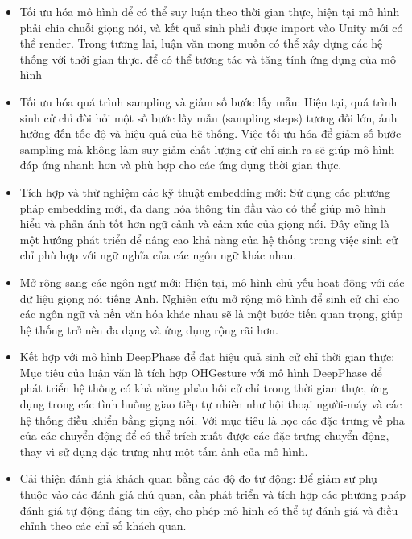 \begin{itemize}
	\item Tối ưu hóa mô hình để có thể suy luận theo thời gian thực, hiện tại mô hình phải chia chuỗi giọng nói, và kết quả sinh phải được  import vào Unity mới có thể render. Trong tương lai, luận văn mong muốn có thể xây dựng các hệ thống với thời gian thực. để có thể tương tác và tăng tính ứng dụng của mô hình
	
	\item Tối ưu hóa quá trình sampling và giảm số bước lấy mẫu: Hiện tại, quá trình sinh cử chỉ đòi hỏi một số bước lấy mẫu (sampling steps) tương đối lớn, ảnh hưởng đến tốc độ và hiệu quả của hệ thống. Việc tối ưu hóa để giảm số bước sampling mà không làm suy giảm chất lượng cử chỉ sinh ra sẽ giúp mô hình đáp ứng nhanh hơn và phù hợp cho các ứng dụng thời gian thực.
	
	\item Tích hợp và thử nghiệm các kỹ thuật embedding mới: Sử dụng các phương pháp embedding mới, đa dạng hóa thông tin đầu vào có thể giúp mô hình hiểu và phản ánh tốt hơn ngữ cảnh và cảm xúc của giọng nói. Đây cũng là một hướng phát triển để nâng cao khả năng của hệ thống trong việc sinh cử chỉ phù hợp với ngữ nghĩa của các ngôn ngữ khác nhau.
	
	\item Mở rộng sang các ngôn ngữ mới: Hiện tại, mô hình chủ yếu hoạt động với các dữ liệu giọng nói tiếng Anh. Nghiên cứu mở rộng mô hình để sinh cử chỉ cho các ngôn ngữ và nền văn hóa khác nhau sẽ là một bước tiến quan trọng, giúp hệ thống trở nên đa dạng và ứng dụng rộng rãi hơn.
	
	\item Kết hợp với mô hình DeepPhase \cite{starke2022deepphase} để đạt hiệu quả sinh cử chỉ thời gian thực: Mục tiêu của luận văn là tích hợp OHGesture với mô hình DeepPhase để phát triển hệ thống có khả năng phản hồi cử chỉ trong thời gian thực, ứng dụng trong các tình huống giao tiếp tự nhiên như hội thoại người-máy và các hệ thống điều khiển bằng giọng nói. Với mục tiêu là học các đặc trưng về pha của các chuyển động để có thể trích xuất được các đặc trưng chuyển động, thay vì sử dụng đặc trưng như một tấm ảnh của mô hình.
	
	\item Cải thiện đánh giá khách quan bằng các độ đo tự động: Để giảm sự phụ thuộc vào các đánh giá chủ quan, cần phát triển và tích hợp các phương pháp đánh giá tự động đáng tin cậy, cho phép mô hình có thể tự đánh giá và điều chỉnh theo các chỉ số khách quan.
\end{itemize}

